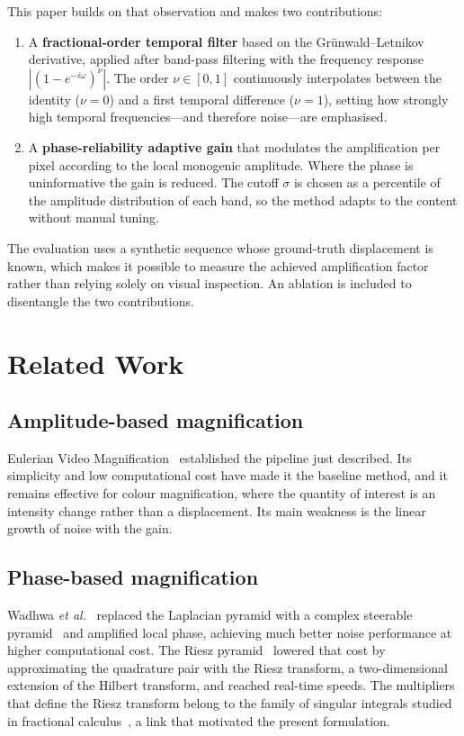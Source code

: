 \documentclass[conference]{IEEEtran}
\begin{document}
This paper builds on that observation and makes two contributions:

\begin{enumerate}
\item A \textbf{fractional-order temporal filter} based on the
Gr\"unwald--Letnikov derivative, applied after band-pass filtering with the
frequency response $|(1-e^{-i\omega})^{\nu}|$. The order
$\nu \in [0,1]$ continuously interpolates between the identity ($\nu=0$) and a
first temporal difference ($\nu=1$), setting how strongly high temporal
frequencies---and therefore noise---are emphasised.

\item A \textbf{phase-reliability adaptive gain} that modulates the
amplification per pixel according to the local monogenic amplitude. Where the
phase is uninformative the gain is reduced. The cutoff $\sigma$ is chosen as a
percentile of the amplitude distribution of each band, so the method adapts to
the content without manual tuning.
\end{enumerate}

The evaluation uses a synthetic sequence whose ground-truth displacement is
known, which makes it possible to measure the achieved amplification factor
rather than relying solely on visual inspection. An ablation is included to
disentangle the two contributions.

\section{Related Work}

\subsection{Amplitude-based magnification}
Eulerian Video Magnification~\cite{wu2012} established the pipeline just
described. Its simplicity and low computational cost have made it the baseline
method, and it remains effective for colour magnification, where the quantity
of interest is an intensity change rather than a displacement. Its main
weakness is the linear growth of noise with the gain.

\subsection{Phase-based magnification}
Wadhwa \emph{et al.}~\cite{wadhwa2013} replaced the Laplacian pyramid with a
complex steerable pyramid~\cite{simoncelli1995} and amplified local phase,
achieving much better noise performance at higher computational cost. The Riesz
pyramid~\cite{wadhwa2014} lowered that cost by approximating the quadrature
pair with the Riesz transform, a two-dimensional extension of the Hilbert
transform, and reached real-time speeds. The multipliers that define the Riesz
transform belong to the family of singular integrals studied in fractional
calculus~\cite{podlubny1999}, a link that motivated the present formulation.
\end{document}
